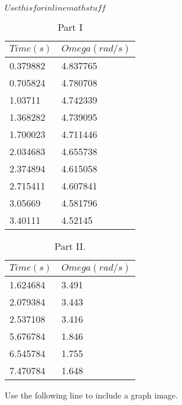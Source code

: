 \documentclass[a4paper,12pt]{article}
\begin{document}
\(Use this for inline math stuff\)

\begin{table}[!htb]
\centering
\begin{tabular}{|l|l|}
\hline
$Time (s)$&$Omega (rad/s)$\\
\hline
0.379882&4.837765\\
0.705824&4.780708\\
1.03711&4.742339\\
1.368282&4.739095\\
1.700023&4.711446\\
2.034683&4.655738\\
2.374894&4.615058\\
2.715411&4.607841\\
3.05669&4.581796\\
3.40111&4.52145\\
\hline
\end{tabular}
\caption {Part I} \label{tab:ia}
\end{table}

\begin{table}[!htb]
\centering
\begin{tabular}{|l|l|}
\hline
$Time (s)$&$Omega (rad/s)$\\
\hline
1.624684&3.491\\
2.079384&3.443\\
2.537108&3.416\\
\hline
\hline
5.676784&1.846\\
6.545784&1.755\\
7.470784&1.648\\
\hline
\end{tabular}
\caption {Part II.} \label{tab:ii}
\end{table}

Use the following line to include a graph image. 
\end{document}
